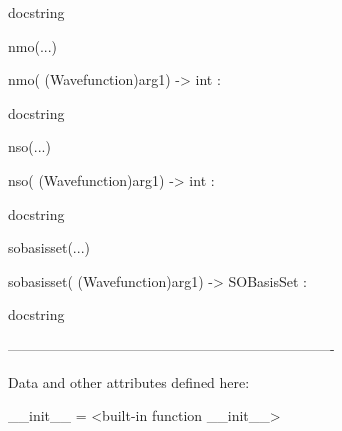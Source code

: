 \documentclass[letterpaper,10pt,english]{sphinxmanual}
\begin{document}
\begin{description}
\begin{description}
\begin{DUlineblock}{0em}
\begin{DUlineblock}{\DUlineblockindent}
\begin{DUlineblock}{\DUlineblockindent}
\item[] docstring
\item[] 
\end{DUlineblock}
\end{DUlineblock}
\item[] nmo(...)
\item[]
\begin{DUlineblock}{\DUlineblockindent}
\item[] nmo( (Wavefunction)arg1) -\textgreater{} int :
\item[]
\begin{DUlineblock}{\DUlineblockindent}
\item[] docstring
\item[] 
\end{DUlineblock}
\end{DUlineblock}
\item[] nso(...)
\item[]
\begin{DUlineblock}{\DUlineblockindent}
\item[] nso( (Wavefunction)arg1) -\textgreater{} int :
\item[]
\begin{DUlineblock}{\DUlineblockindent}
\item[] docstring
\item[] 
\end{DUlineblock}
\end{DUlineblock}
\item[] sobasisset(...)
\item[]
\begin{DUlineblock}{\DUlineblockindent}
\item[] sobasisset( (Wavefunction)arg1) -\textgreater{} SOBasisSet :
\item[]
\begin{DUlineblock}{\DUlineblockindent}
\item[] docstring
\item[] 
\end{DUlineblock}
\end{DUlineblock}
\item[] ----------------------------------------------------------------------
\item[] Data and other attributes defined here:
\item[] 
\item[] \_\_init\_\_ = \textless{}built-in function \_\_init\_\_\textgreater{}
\item[]
\begin{DUlineblock}{\DUlineblockindent}

\end{DUlineblock}
\end{DUlineblock}
\end{description}
\end{description}
\end{document}
